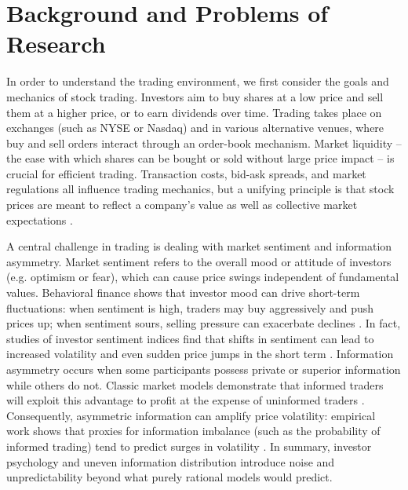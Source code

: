 \section{Background and Problems of Research}
\label{sec:background}
In order to understand the trading environment, we first consider the goals and mechanics of stock trading. Investors aim to buy shares at a low price and sell them at a higher price, or to earn dividends over time. Trading takes place on exchanges (such as NYSE or Nasdaq) and in various alternative venues, where buy and sell orders interact through an order-book mechanism. Market liquidity – the ease with which shares can be bought or sold without large price impact – is crucial for efficient trading. Transaction costs, bid-ask spreads, and market regulations all influence trading mechanics, but a unifying principle is that stock prices are meant to reflect a company’s value as well as collective market expectations \cite{Brealey2022}.

A central challenge in trading is dealing with market sentiment and information asymmetry. Market sentiment refers to the overall mood or attitude of investors (e.g. optimism or fear), which can cause price swings independent of fundamental values. Behavioral finance shows that investor mood can drive short-term fluctuations: when sentiment is high, traders may buy aggressively and push prices up; when sentiment sours, selling pressure can exacerbate declines \cite{Kahneman2011}. In fact, studies of investor sentiment indices find that shifts in sentiment can lead to increased volatility and even sudden price jumps in the short term \cite{Ung2024}. Information asymmetry occurs when some participants possess private or superior information while others do not. Classic market models demonstrate that informed traders will exploit this advantage to profit at the expense of uninformed traders \cite{Kyle1985}. Consequently, asymmetric information can amplify price volatility: empirical work shows that proxies for information imbalance (such as the probability of informed trading) tend to predict surges in volatility \cite{Watanabe2008}. In summary, investor psychology and uneven information distribution introduce noise and unpredictability beyond what purely rational models would predict.

